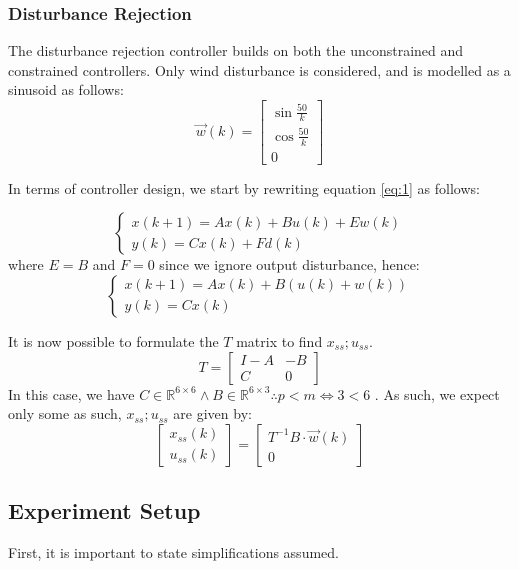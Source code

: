 \documentclass[conference, tikz]{IEEEtran}
\begin{document}
\subsubsection{Disturbance Rejection}
The disturbance rejection controller builds on both the unconstrained and constrained controllers. 
Only wind disturbance is considered, and is modelled as a sinusoid as follows:
\[
    \vec{w}(k)
    =
    \begin{bmatrix}
        \sin{\frac{50}{k}}\\
        \cos{\frac{50}{k}}\\
        0
    \end{bmatrix}
\]

In terms of controller design, we start by rewriting equation \ref{eq:1} as follows:

\[
    \begin{cases}
    x(k+1) = Ax(k) + Bu(k) + Ew(k)\\
    y(k) = Cx(k) + Fd(k)
    \end{cases}
\]
where $E = B$ and $F=0$ since we ignore output disturbance, hence:
\[
    \begin{cases}
        x(k+1) = Ax(k) + B(u(k) + w(k))\\
        y(k) = Cx(k)
    \end{cases}
\]

It is now possible to formulate the $T$ matrix to find $x_{ss};u_{ss}$.
\[
    T = 
    \begin{bmatrix}
        I-A & -B\\
        C & 0
    \end{bmatrix}
\]
In this case, we have $C \in \mathbb{R}^{6 \times 6} \land B \in \mathbb{R}^{6 \times 3} \therefore p < m \iff 3 < 6$ . 
As such, we expect only some 
as such, $x_{ss};u_{ss}$ are given by:
\[
    \begin{bmatrix}
        x_{ss}(k)\\
        u_{ss}(k)
    \end{bmatrix}
    =
    \begin{bmatrix}
        T^{-1}B\cdot \vec w(k)\\

        0
    \end{bmatrix}

\]


\subsection{Experiment Setup}
First, it is important to state simplifications assumed. 
\end{document}
